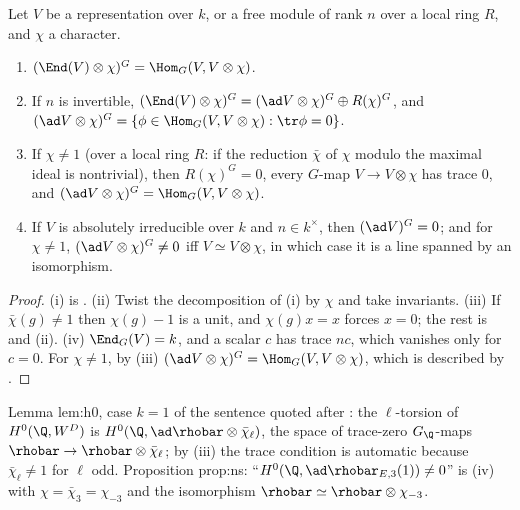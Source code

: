 \begin{proposition}\label{prop:reps:H0-twisted-adjoint}
Let $V$ be a representation over $k$, or a free module of rank $n$ over a local ring $R$, and $\chi$ a character.
\begin{enumerate}[label=(\roman*)]
\item $(\End(V)\otimes\chi)^G=\Hom_G(V,V\otimes\chi)$.
\item If $n$ is invertible, $(\End(V)\otimes\chi)^G=(\ad V\otimes\chi)^G\oplus R(\chi)^G$, and $(\ad V\otimes\chi)^G=\{\phi\in\Hom_G(V,V\otimes\chi):\tr\phi=0\}$.
\item If $\chi\ne1$ (over a local ring $R$: if the reduction $\bar\chi$ of $\chi$ modulo the maximal ideal is nontrivial), then $R(\chi)^G=0$, every
$G$-map $V\to V\otimes\chi$ has trace $0$, and $(\ad V\otimes\chi)^G=\Hom_G(V,V\otimes\chi)$.
\item If $V$ is absolutely irreducible over $k$ and $n\in k^\times$, then $(\ad V)^G=0$; and for $\chi\ne1$, $(\ad V\otimes\chi)^G\ne0$ iff $V\simeq V\otimes\chi$, in
which case it is a line spanned by an isomorphism.
\end{enumerate}
\end{proposition}

\begin{proof}
(i) is . (ii) Twist the decomposition of (i) by $\chi$ and take invariants. (iii) If $\bar\chi(g)\ne1$ then
$\chi(g)-1$ is a unit, and $\chi(g)x=x$ forces $x=0$; the rest is  and (ii). (iv) $\End_G(V)=k$, and a scalar $c$ has
trace $nc$, which vanishes only for $c=0$. For $\chi\ne1$, by (iii) $(\ad V\otimes\chi)^G=\Hom_G(V,V\otimes\chi)$, which is described by
.
\end{proof}

\begin{paperlink}
Lemma lem:h0, case $k=1$ of the sentence quoted after : the $\ell$-torsion of $H^0(\Q,W^D)$ is $H^0(\Q,\ad\rhobar\otimes\bar\chi_\ell)$, the
space of trace-zero $G_\Q$-maps $\rhobar\to\rhobar\otimes\bar\chi_\ell$; by (iii) the trace condition is automatic because $\bar\chi_\ell\ne1$ for $\ell$ odd. Proposition prop:ns: ``$H^0(\Q,\ad\rhobar_{E,3}(1))\ne0$'' is (iv) with $\chi=\bar\chi_3=\chi_{-3}$
and the isomorphism $\rhobar\simeq\rhobar\otimes\chi_{-3}$.
\end{paperlink}

